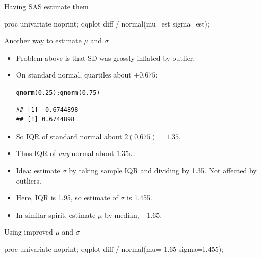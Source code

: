 \documentclass[unknownkeysallowed]{beamer}\usepackage[]{graphicx}\usepackage[]{color}
\makeatletter
\newcommand{\hlnum}[1]{\textcolor[rgb]{0.686,0.059,0.569}{#1}}%
\newcommand{\hlstd}[1]{\textcolor[rgb]{0.345,0.345,0.345}{#1}}%
\newcommand{\hlkwd}[1]{\textcolor[rgb]{0.737,0.353,0.396}{\textbf{#1}}}%
\newenvironment{kframe}{%
 \def\at@end@of@kframe{}%
 \ifinner\ifhmode%
  \def\at@end@of@kframe{\end{minipage}}%
  \begin{minipage}{\columnwidth}%
 \fi\fi%
 \def\FrameCommand##1{\hskip\@totalleftmargin \hskip-\fboxsep
 \colorbox{shadecolor}{##1}\hskip-\fboxsep
     \hskip-\linewidth \hskip-\@totalleftmargin \hskip\columnwidth}%
 \MakeFramed {\advance\hsize-\width
   \@totalleftmargin\z@ \linewidth\hsize
   \@setminipage}}%
 {\par\unskip\endMakeFramed%
 \at@end@of@kframe}
\newenvironment{knitrout}{}{} %
\makeatother
\begin{document}
\begin{frame}[fragile]{Having SAS estimate them}

\begin{Sascode}[store=if]
  proc univariate noprint;
    qqplot diff / normal(mu=est sigma=est);
\end{Sascode}

  
\end{frame}

\begin{frame}[fragile]{Another way to estimate $\mu$ and $\sigma$}

  \begin{itemize}
  \item Problem above is that SD was grossly inflated by outlier.
  \item On standard normal, quartiles about $\pm 0.675$:
\begin{knitrout}
\color{fgcolor}\begin{kframe}
\begin{alltt}
\hlkwd{qnorm}\hlstd{(}\hlnum{0.25}\hlstd{);} \hlkwd{qnorm}\hlstd{(}\hlnum{0.75}\hlstd{)}
\end{alltt}
\begin{verbatim}
## [1] -0.6744898
## [1] 0.6744898
\end{verbatim}
\end{kframe}
\end{knitrout}
\item So IQR of standard normal about $2(0.675)=1.35$.
\item Thus IQR of \emph{any} normal about $1.35\sigma$.
\item Idea: estimate $\sigma$ by taking sample IQR and dividing by
  1.35. Not affected by outliers.
\item Here, IQR is 1.95,
so estimate of $\sigma$ is 1.455.
\item  In similar spirit, estimate $\mu$ by median, $-1.65$.
  \end{itemize} 
  
\end{frame}

\begin{frame}[fragile]{Using improved $\mu$ and $\sigma$}

\begin{Sascode}[store=ig]
  proc univariate noprint;
    qqplot diff / normal(mu=-1.65 sigma=1.455);
\end{Sascode}

  
\end{frame}
\end{document}
